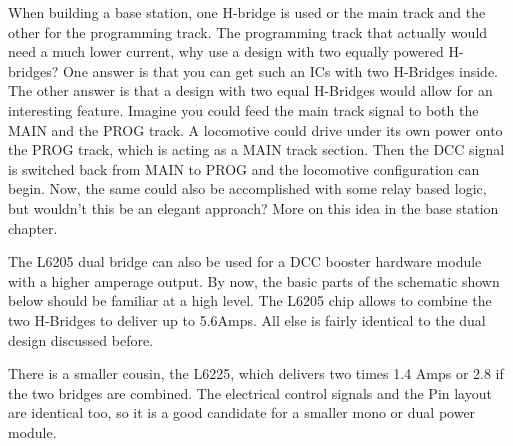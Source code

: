 \FloatBarrier

When building a base station, one H-bridge is used or the main track and the other for the programming track. The programming track that actually would need a much lower current, why use a design with two equally powered H-bridges? One answer is that you can get such an ICs with two H-Bridges inside. The other answer is that a design with two equal H-Bridges would allow for an interesting feature. Imagine you could feed the main track signal to both the MAIN and the PROG track. A locomotive could drive under its own power onto the PROG track, which is acting as a MAIN track section. Then the DCC signal is switched back from MAIN to PROG and the locomotive configuration can begin. Now, the same could also be accomplished with some relay based logic, but wouldn't this be an elegant approach? More on this idea in the base station chapter.


The L6205 dual bridge can also be used for a DCC booster hardware module with a higher amperage output. By now, the basic parts of the schematic shown below should be familiar at a high level. The L6205 chip allows to combine the two H-Bridges to deliver up to 5.6Amps. All else is fairly identical to the dual design discussed before.

\FloatBarrier

There is a smaller cousin, the L6225, which delivers two times 1.4 Amps or 2.8 if the two bridges are combined. The electrical control signals and the Pin layout are identical too, so it is a good candidate for a smaller mono or dual power module.


